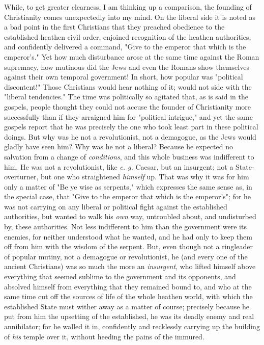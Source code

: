 While, to get greater clearness, I am thinking up a comparison, the founding 
of Christianity comes unexpectedly into my mind. On the liberal side it is 
noted as a bad point in the first Christians that they preached obedience to 
the established heathen civil order, enjoined recognition of the heathen 
authorities, and confidently delivered a command, "{}Give to the emperor that 
which is the emperor's."{} Yet how much disturbance arose at the same time 
against the Roman supremacy, how mutinous did the Jews and even the Romans 
show themselves against their own temporal government! In short, how popular 
was "{}political discontent!"{} Those Christians would hear nothing of it; 
would not side with the "{}liberal tendencies."{} The time was politically so 
agitated that, as is said in the gospels, people thought they could not accuse 
the founder of Christianity more successfully than if they arraigned him for 
"{}political intrigue,"{} and yet the same gospels report that he was 
precisely the one who took least part in these political doings. But why was 
he not a revolutionist, not a demagogue, as the Jews would gladly have seen 
him? Why was he not a liberal? Because he expected no salvation from a change 
of \textit{conditions}, and this whole business was indifferent to him. He was 
not a revolutionist, like \textit{e. g.} Caesar, but an insurgent; not a 
State-overturner, but one who straightened \textit{himself} up. That was why 
it was for him only a matter of "{}Be ye wise as serpents,"{} which expresses 
the same sense as, in the special case, that "{}Give to the emperor that which 
is the emperor's"{}; for he was not carrying on any liberal or political fight 
against the established authorities, but wanted to walk his \textit{own} way, 
untroubled about, and undisturbed by, these authorities. Not less indifferent 
to him than the government were its enemies, for neither understood what he 
wanted, and he had only to keep them off from him with the wisdom of the 
serpent. But, even though not a ringleader of popular mutiny, not a demagogue 
or revolutionist, he (and every one of the ancient Christians) was so much the 
more an \textit{insurgent}, who lifted himself above everything that seemed 
sublime to the government and its opponents, and absolved himself from 
everything that they remained bound to, and who at the same time cut off the 
sources of life of the whole heathen world, with which the established State 
must wither away as a matter of course; precisely because he put from him the 
upsetting of the established, he was its deadly enemy and real annihilator; 
for he walled it in, confidently and recklessly carrying up the building of 
\textit{his} temple over it, without heeding the pains of the immured.

